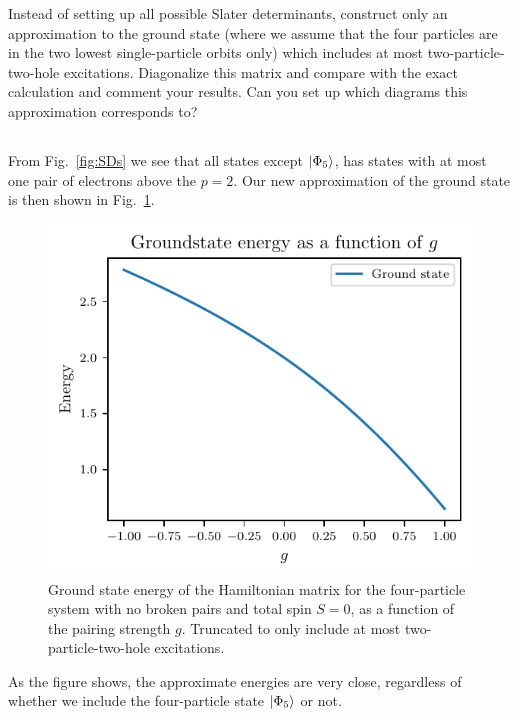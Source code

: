 
Instead of setting up all possible Slater determinants, construct only an approximation to the ground state (where we assume that the four particles are in the two lowest single-particle orbits only) which includes at most two-particle-two-hole excitations.
Diagonalize this matrix and compare with the exact calculation and comment your results.
Can you set up which diagrams this approximation corresponds to?

\subsection{}
From Fig.~\ref{fig:SDs} we see that all states except $\lvert\Phi_5\rangle$, has states with at most one pair of electrons above the $p=2$.
Our new approximation of the ground state is then shown in Fig.~\ref{fig:c_groundstate}.

\begin{figure}[htbp]
    \centering
    \includegraphics{figures/c_ground_state_energy.pdf}
    \caption{
        Ground state energy of the Hamiltonian matrix for the four-particle system with no broken pairs and total spin $S = 0$, as a function of the pairing strength $g$.
        Truncated to only include at most two-particle-two-hole excitations.\label{fig:c_groundstate}
    }
\end{figure}

As the figure shows, the approximate energies are very close, regardless of whether we include the four-particle state $\lvert\Phi_5\rangle$ or not.

